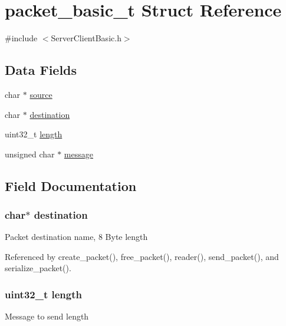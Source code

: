 \hypertarget{structpacket__basic__t}{}\section{packet\+\_\+basic\+\_\+t Struct Reference}
\label{structpacket__basic__t}


{\ttfamily \#include $<$Server\+Client\+Basic.\+h$>$}

\subsection*{Data Fields}
\begin{DoxyCompactItemize}
\item 
char $\ast$ \hyperlink{structpacket__basic__t_aee6937c81d468a0915308234d09d212c}{source}
\item 
char $\ast$ \hyperlink{structpacket__basic__t_ae98a0878a8abb793b89317d904f8c00a}{destination}
\item 
uint32\+\_\+t \hyperlink{structpacket__basic__t_aebb70c2aab3407a9f05334c47131a43b}{length}
\item 
unsigned char $\ast$ \hyperlink{structpacket__basic__t_abb13456032cf48eaa794391b6ed937c7}{message}
\end{DoxyCompactItemize}


\subsection{Field Documentation}
\subsubsection[{\texorpdfstring{destination}{destination}}]{\setlength{\rightskip}{0pt plus 5cm}char$\ast$ destination}\hypertarget{structpacket__basic__t_ae98a0878a8abb793b89317d904f8c00a}{}\label{structpacket__basic__t_ae98a0878a8abb793b89317d904f8c00a}
Packet destination name, 8 Byte length 

Referenced by create\+\_\+packet(), free\+\_\+packet(), reader(), send\+\_\+packet(), and serialize\+\_\+packet().

\subsubsection[{\texorpdfstring{length}{length}}]{\setlength{\rightskip}{0pt plus 5cm}uint32\+\_\+t length}\hypertarget{structpacket__basic__t_aebb70c2aab3407a9f05334c47131a43b}{}\label{structpacket__basic__t_aebb70c2aab3407a9f05334c47131a43b}
Message to send length 

